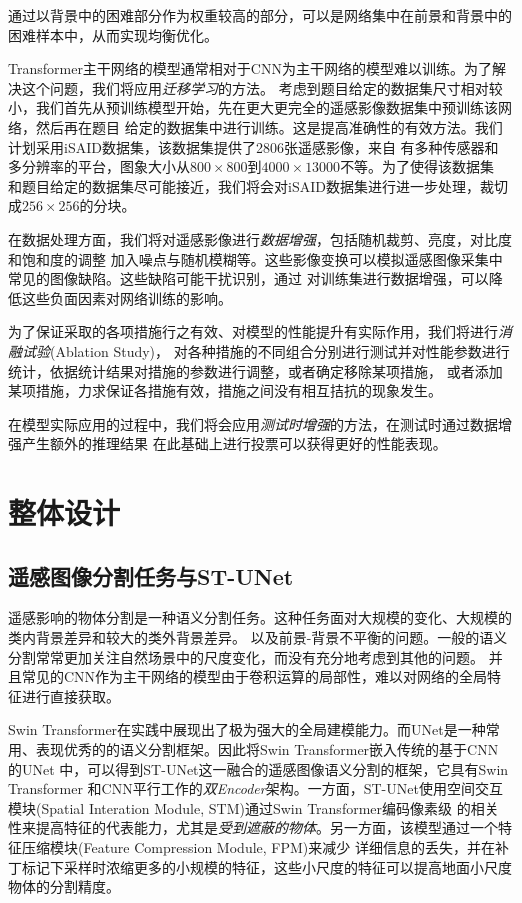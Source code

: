 \documentclass[a4paper,twoside,zihao=5,UTF8]{ctexrep}
\begin{document}
通过以背景中的困难部分作为权重较高的部分，可以是网络集中在前景和背景中的困难样本中，从而实现均衡优化。

Transformer主干网络的模型通常相对于CNN为主干网络的模型难以训练。为了解决这个问题，我们将应用\emph{迁移学习}的方法。
考虑到题目给定的数据集尺寸相对较小，我们首先从预训练模型开始，先在更大更完全的遥感影像数据集中预训练该网络，然后再在题目
给定的数据集中进行训练。这是提高准确性的有效方法。我们计划采用iSAID数据集\cite{isaid}，该数据集提供了2806张遥感影像，来自
有多种传感器和多分辨率的平台，图象大小从$800\times800$到$4000\times13000$不等。为了使得该数据集
和题目给定的数据集尽可能接近，我们将会对iSAID数据集进行进一步处理，裁切成$256\times256$的分块。

在数据处理方面，我们将对遥感影像进行\emph{数据增强}，包括随机裁剪、亮度，对比度和饱和度的调整
加入噪点与随机模糊等。这些影像变换可以模拟遥感图像采集中常见的图像缺陷。这些缺陷可能干扰识别，通过
对训练集进行数据增强，可以降低这些负面因素对网络训练的影响。

为了保证采取的各项措施行之有效、对模型的性能提升有实际作用，我们将进行\emph{消融试验}(Ablation Study)，
对各种措施的不同组合分别进行测试并对性能参数进行统计，依据统计结果对措施的参数进行调整，或者确定移除某项措施，
或者添加某项措施，力求保证各措施有效，措施之间没有相互拮抗的现象发生。

在模型实际应用的过程中，我们将会应用\emph{测试时增强}的方法，在测试时通过数据增强产生额外的推理结果
在此基础上进行投票可以获得更好的性能表现。


\chapter{整体设计}

\section{遥感图像分割任务与ST-UNet}
遥感影响的物体分割是一种语义分割任务。这种任务面对大规模的变化、大规模的类内背景差异和较大的类外背景差异。
以及前景-背景不平衡的问题。一般的语义分割常常更加关注自然场景中的尺度变化，而没有充分地考虑到其他的问题\cite{farseg}。
并且常见的CNN作为主干网络的模型由于卷积运算的局部性，难以对网络的全局特征进行直接获取。

Swin Transformer在实践中展现出了极为强大的全局建模能力。而UNet是一种常用、表现优秀的的语义分割框架。因此将Swin Transformer嵌入传统的基于CNN的UNet
中，可以得到ST-UNet这一融合的遥感图像语义分割的框架\cite{stunet}，它具有Swin Transformer
和CNN平行工作的\emph{双Encoder}架构。一方面，ST-UNet使用空间交互模块(Spatial Interation Module, STM)通过Swin Transformer编码像素级
的相关性来提高特征的代表能力，尤其是\emph{受到遮蔽的物体}。另一方面，该模型通过一个特征压缩模块(Feature Compression Module, FPM)来减少
详细信息的丢失，并在补丁标记下采样时浓缩更多的小规模的特征，这些小尺度的特征可以提高地面小尺度物体的分割精度。
\end{document}
